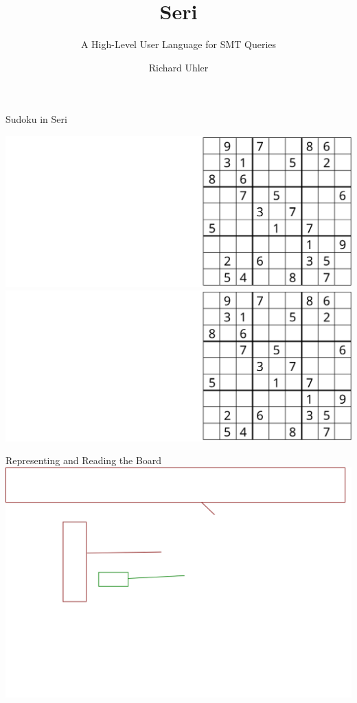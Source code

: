 \documentclass{beamer}
\title{Seri}
\subtitle{A High-Level User Language for SMT Queries}
\author{Richard Uhler}
\begin{document}
\begin{frame}
    \titlepage
\end{frame}

\begin{frame}{Sudoku in Seri}
\begin{overprint}
 \includegraphics[width=\textwidth]{input1}
 \includegraphics[width=\textwidth]{input2}
\end{overprint}
\end{frame}
 
\begin{frame}{Representing and Reading the Board}
\includegraphics[width=\textwidth]{parser}
\end{frame}
\end{document}
